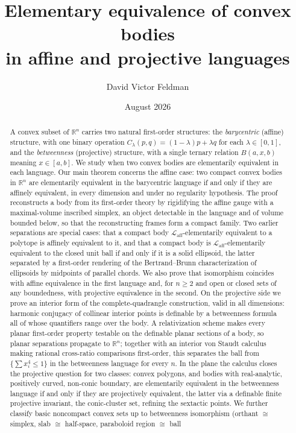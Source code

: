 \documentclass[11pt]{amsart}
\title[Elementary equivalence of convex bodies]{Elementary equivalence of convex bodies\\ in affine and projective languages}
\author{David Victor Feldman}
\date{August 2026}
\theoremstyle{definition}
\newcommand{\R}{\mathbb{R}}
\newcommand{\Laff}{\mathcal{L}_{\mathrm{aff}}}
\begin{document}
\begin{abstract}
A convex subset of $\R^n$ carries two natural first-order structures: the
\emph{barycentric} (affine) structure, with one binary operation
$C_\lambda(p,q)=(1-\lambda)p+\lambda q$ for each $\lambda\in[0,1]$, and the
\emph{betweenness} (projective) structure, with a single ternary relation
$B(a,x,b)$ meaning $x\in[a,b]$. We study when two convex bodies are
elementarily equivalent in each language. Our main theorem concerns the affine
case: two compact convex bodies in $\R^n$ are elementarily
equivalent in the barycentric language if and only if they are affinely
equivalent, in every dimension and under no regularity hypothesis. The proof
reconstructs a body from its first-order theory by rigidifying the affine
gauge with a maximal-volume inscribed simplex, an object detectable in the
language and of volume bounded below, so that the reconstructing frames form a
compact family. Two earlier separations are special cases: that a compact body
$\Laff$-elementarily equivalent to a polytope is affinely equivalent to it,
and that a compact body is $\Laff$-elementarily equivalent to the closed unit
ball if and only if it is a solid ellipsoid, the latter separated by a
first-order rendering of the Bertrand--Brunn characterization of ellipsoids by
midpoints of parallel chords. We also prove that isomorphism coincides with affine equivalence in
the first language and, for $n\ge2$ and open or closed sets of any
boundedness, with projective equivalence in the second. On the projective side we prove an interior form of the
complete-quadrangle construction, valid in all dimensions: harmonic conjugacy
of collinear interior points is definable by a betweenness formula all of
whose quantifiers range over the body. A relativization scheme makes every
planar first-order property testable on the definable planar sections of a
body, so planar separations propagate to $\R^n$; together with an interior von Staudt calculus making rational cross-ratio
comparisons first-order, this separates the ball from
$\{\sum x_i^4\le1\}$ in the betweenness language for every $n$. In the plane
the calculus closes the projective question for two classes: convex polygons,
and bodies with real-analytic, positively curved, non-conic boundary, are
elementarily equivalent in the betweenness language if and only if they are
projectively equivalent, the latter via a definable finite projective
invariant, the conic-cluster set, refining the sextactic points. We further
classify basic noncompact convex sets up to betweenness isomorphism (orthant
$\cong$ simplex, slab $\cong$ half-space, paraboloid region $\cong$ ball

\end{abstract}
\end{document}
